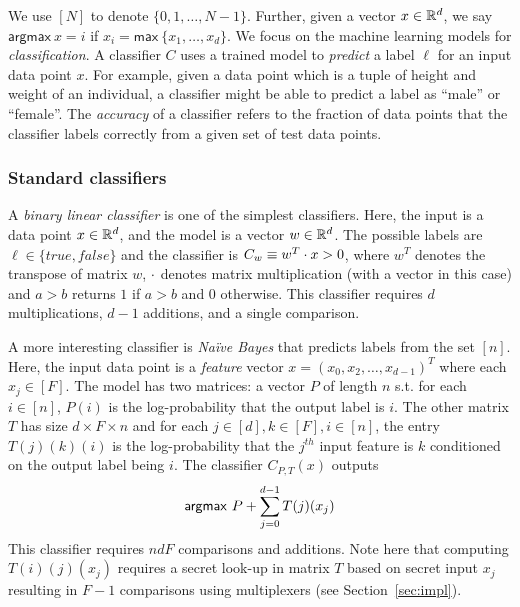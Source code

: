 We use $[N]$ to denote $\{0,1,\dotsc, N-1\}$. Further, given a vector $x\in{\mathbb{R}}^d$, we say $\mathsf{argmax}\ x = i$ if $x_i = \mathsf{max}\ \{x_1,\ldots,x_d\}$. We focus on the machine learning models for {\it classification}. A classifier $C$ uses a trained model to {\it predict} a
label $\ell$ for an input data point $x$. For example, given a
data point which is a tuple of height and weight of an individual,
a classifier might be able to predict a label as ``male'' or ``female''. The {\it
  accuracy} of a classifier refers to the fraction of data points that
the classifier labels correctly from a given set of test data
points.

\subsubsection*{Standard classifiers}
A {\em binary linear classifier} is one of the simplest classifiers. Here,
the input is a data point $x\in{\mathbb{R}}^d$,
and the model is a vector $w\in{\mathbb{R}}^d$. The possible labels are
$\ell\in\{\mathit{true},\mathit{false}\}$ and the classifier is
$C_w\equiv w^T\cdot x>0$, where $w^T$ denotes the transpose
of matrix $w$, $\cdot$ denotes matrix multiplication (with a vector in this case) and $a>b$ returns $1$ if $a>b$ and $0$ otherwise. This classifier requires $d$ multiplications, $d-1$
additions, and a single comparison.

A more interesting classifier is {\em Na\"{i}ve Bayes} that predicts labels
from the set $[n]$.
Here, the input data point is a {\it feature}
vector $x=(x_0,x_2,\ldots,x_{d-1})^T$ where each $x_j\in [F]$.
The model has two matrices: a vector $P$ of length $n$ s.t. for each
$i
\in [n]$, $P(i)$ is the log-probability that the output label is $i$.
The other matrix $T$ has size $d\times F\times n$ and for each $j\in
[d], k\in [F], i\in [n]$, the entry $T(j)(k)(i)$ is 
the log-probability that  the $j^{th}$ input feature is $k$  conditioned on  the output label being $i$.
The classifier $C_{P,T}(x)$ outputs
\[
{\sf argmax}\ P+\sum_{j=0}^{d-1} T(j)(x_j)
\]
This classifier requires $ndF$ comparisons and additions. Note here  that computing $T(i)(j)(x_j)$ requires a secret look-up in matrix  $T$  based on secret input $x_j$ resulting in $F-1$ comparisons using multiplexers (see
  Section~\ref{sec:impl}). %

